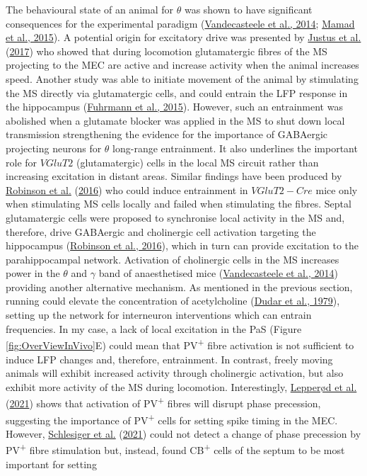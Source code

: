 \documentclass[
  12pt,
  a4paper,
  openany]{book}
\begin{document}
The behavioural state of an animal for \(\theta\) was shown to have significant consequences for the experimental paradigm (\protect\hyperlink{ref-vandecasteele_optogenetic_2014}{Vandecasteele et al., 2014}; \protect\hyperlink{ref-mamad_medial_2015}{Mamad et al., 2015}). A potential origin for excitatory drive was presented by \protect\hyperlink{ref-justus_glutamatergic_2017}{Justus et al.} (\protect\hyperlink{ref-justus_glutamatergic_2017}{2017}) who showed that during locomotion glutamatergic fibres of the MS projecting to the MEC are active and increase activity when the animal increases speed. Another study was able to initiate movement of the animal by stimulating the MS directly via glutamatergic cells, and could entrain the LFP response in the hippocampus (\protect\hyperlink{ref-fuhrmann_locomotion_2015}{Fuhrmann et al., 2015}). However, such an entrainment was abolished when a glutamate blocker was applied in the MS to shut down local transmission strengthening the evidence for the importance of GABAergic projecting neurons for \(\theta\) long-range entrainment. It also underlines the important role for \(VGluT2\) (glutamatergic) cells in the local MS circuit rather than increasing excitation in distant areas. Similar findings have been produced by \protect\hyperlink{ref-robinson_optogenetic_2016}{Robinson et al.} (\protect\hyperlink{ref-robinson_optogenetic_2016}{2016}) who could induce entrainment in \(VGluT2-Cre\) mice only when stimulating MS cells locally and failed when stimulating the fibres. Septal glutamatergic cells were proposed to synchronise local activity in the MS and, therefore, drive GABAergic and cholinergic cell activation targeting the hippocampus (\protect\hyperlink{ref-robinson_optogenetic_2016}{Robinson et al., 2016}), which in turn can provide excitation to the parahippocampal network. Activation of cholinergic cells in the MS increases power in the \(\theta\) and \(\gamma\) band of anaesthetised mice (\protect\hyperlink{ref-vandecasteele_optogenetic_2014}{Vandecasteele et al., 2014}) providing another alternative mechanism. As mentioned in the previous section, running could elevate the concentration of acetylcholine (\protect\hyperlink{ref-dudar_release_1979}{Dudar et al., 1979}), setting up the network for interneuron interventions which can entrain frequencies. In my case, a lack of local excitation in the PaS (Figure \ref{fig:OverViewInVivo}E) could mean that PV\textsuperscript{+} fibre activation is not sufficient to induce LFP changes and, therefore, entrainment. In contrast, freely moving animals will exhibit increased activity through cholinergic activation, but also exhibit more activity of the MS during locomotion. Interestingly, \protect\hyperlink{ref-lepperod_optogenetic_2021}{Lepperød et al.} (\protect\hyperlink{ref-lepperod_optogenetic_2021}{2021}) shows that activation of PV\textsuperscript{+} fibres will disrupt phase precession, suggesting the importance of PV\textsuperscript{+} cells for setting spike timing in the MEC. However, \protect\hyperlink{ref-schlesiger_two_2021}{Schlesiger et al.} (\protect\hyperlink{ref-schlesiger_two_2021}{2021}) could not detect a change of phase precession by PV\textsuperscript{+} fibre stimulation but, instead, found CB\textsuperscript{+} cells of the septum to be most important for setting 
\end{document}
